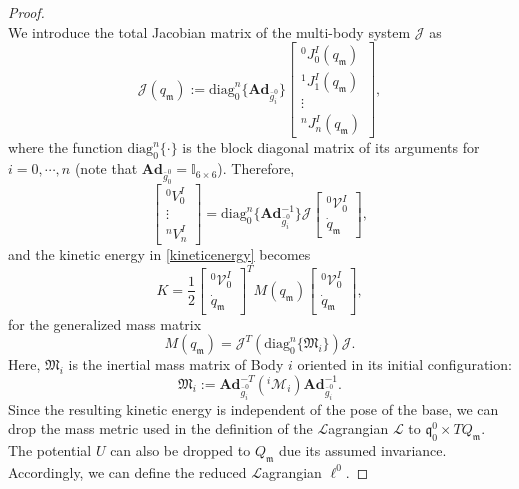 \documentclass[lettersize,journal]{IEEEtran}
\def \q  {\mathfrak{q}}
\def \m  {\mathfrak{m}}
\def \V {\mathcal{V}}
\def \Ad {\textbf{Ad}}
\def \L {\mathcal{L}}
\def \diag {\text{diag}}
\theoremstyle{remark}
\begin{document}
\begin{proof}[Proof]
\begin{equation}
\end{equation}
We introduce the total Jacobian matrix of the multi-body system $\mathcal{J}$ as
\begin{equation}
    \mathcal{J}(q_\mathfrak{m}):=\diag_0^n\{\Ad_{\bar{g}^0_i}\}\begin{bmatrix}{}^0J^I_0(q_\mathfrak{m})\\ {}^1J^I_1(q_\mathfrak{m})\\ \vdots\\ {}^nJ^I_n(q_\mathfrak{m})\end{bmatrix},
    \label{totalJ}
\end{equation}
where the function $\diag_0^n\{\cdot\}$ is the block diagonal matrix of its arguments for $i=0,\cdots,n$ (note that $\Ad_{\bar{g}^0_0}=\mathbb{I}_{6\times 6}$). Therefore,
\begin{equation}
    \begin{bmatrix}{^0V_{0}^I} \\ \vdots \\ {^nV_{n}^I}\end{bmatrix}=
\diag^n_0\{\Ad_{\bar{g}^0_i}^{-1}\}\mathcal{J}\begin{bmatrix}^0\V^I_0\\\dot{q}_\mathfrak{m}\end{bmatrix},
    \label{velvec}
\end{equation}
and the kinetic energy in \eqref{kineticenergy} becomes
\begin{equation}
    K=\frac{1}{2}\begin{bmatrix}^0\V^I_0 \\ \dot{q}_\mathfrak{m}\end{bmatrix}^T M(q_\mathfrak{m}) \begin{bmatrix}^0\V^I_0\\\dot{q}_\mathfrak{m}\end{bmatrix},
\end{equation}
for the generalized mass matrix 
\begin{equation}
    M(q_\mathfrak{m})=\mathcal{J}^T(\diag^n_0\{\mathfrak{M}_i\})\mathcal{J}.%
    \label{totalM}
\end{equation}
Here, $\mathfrak{M}_i$ is the inertial mass matrix of Body $i$ oriented in its initial configuration:
\begin{equation}
    \mathfrak{M}_i :=\Ad_{\bar{g}^0_i}^{-T}({}^i\mathcal{M}_i)\Ad_{\bar{g}^0_i}^{-1}.
    \label{initmass}
\end{equation}
Since the resulting kinetic energy is independent of the pose of the base, we can drop the mass metric used in the definition of the $\L$agrangian $\L$ to $\q^0_0\times TQ_\m$. The potential $U$ can also be dropped to $Q_\m$ due its assumed invariance. Accordingly, we can define the reduced $\L$agrangian $\ell^0$.
\end{proof}
\end{document}
